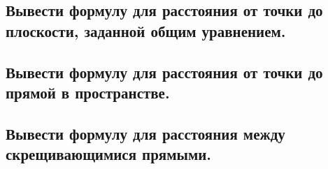 \documentclass[a4paper, 10pt]{article}
\begin{document}
\subsection{Вывести формулу для расстояния от точки до плоскости, заданной общим уравнением. }



\subsection{Вывести формулу для расстояния от точки до прямой в пространстве.}



\subsection{Вывести формулу для расстояния между скрещивающимися прямыми.}
\end{document}
